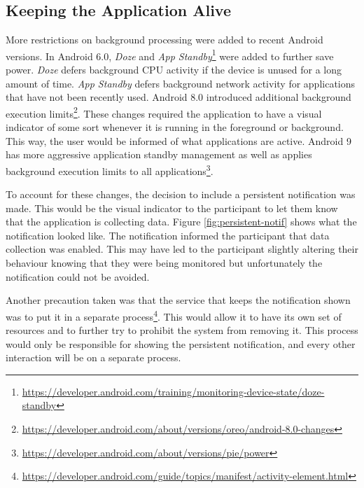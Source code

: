 \documentclass{l4proj}
\begin{document}
\subsection{Keeping the Application Alive}\label{section:keep-app-alive}
More restrictions on background processing were added to recent Android versions. In Android 6.0, \textit{Doze} and \textit{App Standby}\footnote{\url{https://developer.android.com/training/monitoring-device-state/doze-standby}} were added to further save power. \textit{Doze} defers background CPU activity if the device is unused for a long amount of time. \textit{App Standby} defers background network activity for applications that have not been recently used. Android 8.0 introduced additional background execution limits\footnote{\url{https://developer.android.com/about/versions/oreo/android-8.0-changes}}. These changes required the application to have a visual indicator of some sort whenever it is running in the foreground or background. This way, the user would be informed of what applications are active. Android 9 has more aggressive application standby management as well as applies background execution limits to all applications\footnote{\url{https://developer.android.com/about/versions/pie/power}}.

To account for these changes, the decision to include a persistent notification was made. This would be the visual indicator to the participant to let them know that the application is collecting data. Figure \ref{fig:persistent-notif} shows what the notification looked like. The notification informed the participant that data collection was enabled. This may have led to the participant slightly altering their behaviour knowing that they were being monitored but unfortunately the notification could not be avoided.

Another precaution taken was that the service that keeps the notification shown was to put it in a separate process\footnote{\url{https://developer.android.com/guide/topics/manifest/activity-element.html}}. This would allow it to have its own set of resources and to further try to prohibit the system from removing it. This process would only be responsible for showing the persistent notification, and every other interaction will be on a separate process.
\end{document}
